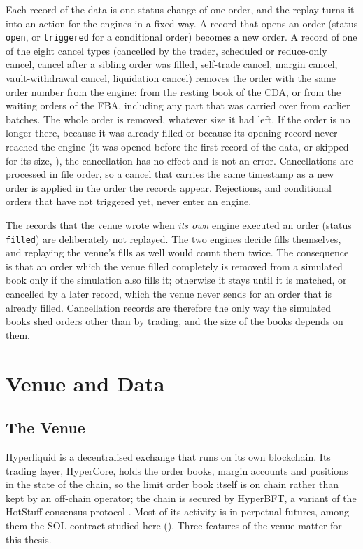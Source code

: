 Each record of the data is one status change of one order, and the replay turns
it into an action for the engines in a fixed way. A record that opens an order
(status \texttt{open}, or \texttt{triggered} for a conditional order) becomes a
new order. A record of one of the eight cancel types (cancelled by the trader,
scheduled or reduce-only cancel, cancel after a sibling order was filled,
self-trade cancel, margin cancel, vault-withdrawal cancel, liquidation cancel)
removes the order with the same order number from the engine: from the resting
book of the CDA, or from the waiting orders of the FBA, including any part that
was carried over from earlier batches. The whole order is removed, whatever size
it had left. If the order is no longer there, because it was already filled or
because its opening record never reached the engine (it was opened before the
first record of the data, or skipped for its size, ), the
cancellation has no effect and is not an error. Cancellations
are processed in file order, so a cancel that carries the same timestamp as a
new order is applied in the order the records appear. Rejections, and conditional
orders that have not triggered yet, never enter an engine.

The records that the venue wrote when \emph{its own} engine executed an order
(status \texttt{filled}) are deliberately not replayed. The two engines decide
fills themselves, and replaying the venue's fills as well would count them
twice. The consequence is that an order which the venue filled completely is
removed from a simulated book only if the simulation also fills it; otherwise it
stays until it is matched, or cancelled by a later record, which the venue never
sends for an order that is already filled. Cancellation records are therefore
the only way the simulated books shed orders other than by trading, and the size
of the books depends on them.

\section{Venue and Data}
\label{sec:data}

\subsection{The Venue}
\label{sec:venue}

Hyperliquid is a decentralised exchange that runs on its own blockchain. Its
trading layer, HyperCore, holds the order books, margin accounts and
positions in the state of the chain, so the limit order book itself is on
chain rather than kept by an off-chain operator; the chain is secured by
HyperBFT, a variant of the HotStuff consensus protocol
\citep{hyperliquid2026docs}. Most of its activity is in perpetual futures,
among them the SOL contract studied here (). Three
features of the venue matter for this thesis.

